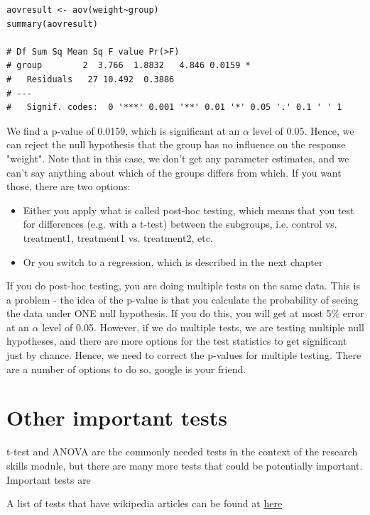 \documentclass[a4paper,twoside]{tufte-book} %
\begin{document}
\begin{lstlisting}
aovresult <- aov(weight~group)
summary(aovresult)

# Df Sum Sq Mean Sq F value Pr(>F)  
# group        2  3.766  1.8832   4.846 0.0159 *
#   Residuals   27 10.492  0.3886                 
# ---
#   Signif. codes:  0 '***' 0.001 '**' 0.01 '*' 0.05 '.' 0.1 ' ' 1
\end{lstlisting}

We find a p-value of 0.0159, which is significant at an $\alpha$ level of 0.05. Hence, we can reject the null hypothesis that the group has no influence on the response "weight". Note that in this case, we don't get any parameter estimates, and we can't say anything about which of the groups differs from which. If you want those, there are two options:
\begin{itemize}
\item Either you apply what is called post-hoc testing, which means that you test for differences (e.g. with a t-test) between the subgroups, i.e. control vs. treatment1, treatment1 vs. treatment2, etc.
\item Or you switch to a regression, which is described in the next chapter
\end{itemize}
If you do post-hoc testing, you are doing multiple tests on the same data. This is a problem - the idea of the p-value is that you calculate the probability of seeing the data under ONE null hypothesis. If you do this, you will get at most 5\% error at an $\alpha$ level of 0.05.  However, if we do multiple tests, we are testing multiple null hypotheses, and there are more options for the test statistics to get significant just by chance. Hence, we need to correct the p-values for multiple testing. There are a number of options to do so, google is your friend. 

\section{Other important tests}

t-test and ANOVA are the commonly needed tests in the context of the research skills module, but there are many more tests that could be potentially important. Important tests are 


A list of tests that have wikipedia articles can be found at \href{http://en.wikipedia.org/wiki/Category:Statistical_tests}{here} 
\end{document}
